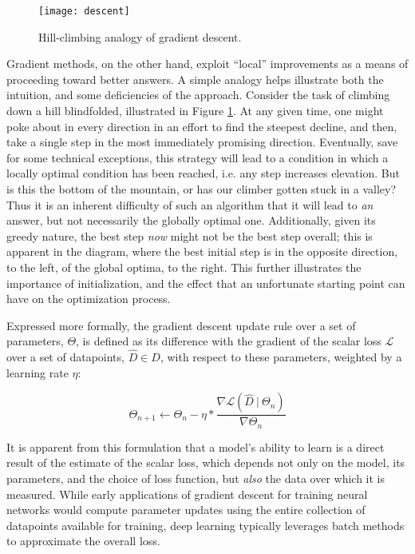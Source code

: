\begin{figure}
\begin{centering}
\texttt{[image: descent]}
\caption{Hill-climbing analogy of gradient descent.}
\label{fig:climbing}
\end{centering}
\end{figure}

Gradient methods, on the other hand, exploit ``local'' improvements as a means of proceeding toward better answers.
A simple analogy helps illustrate both the intuition, and some deficiencies of the approach.
Consider the task of climbing down a hill blindfolded, illustrated in Figure \ref{fig:climbing}.
At any given time, one might poke about in every direction in an effort to find the steepest decline, and then, take a single step in the most immediately promising direction.
Eventually, save for some technical exceptions, this strategy will lead to a condition in which a locally optimal condition has been reached, i.e. any step increases elevation.
But is this the bottom of the mountain, or has our climber gotten stuck in a valley?
Thus it is an inherent difficulty of such an algorithm that it will lead to \emph{an} answer, but not necessarily the globally optimal one.
Additionally, given its greedy nature, the best step \emph{now} might not be the best step overall;
this is apparent in the diagram, where the best initial step is in the opposite direction, to the left, of the global optima, to the right.
This further illustrates the importance of initialization, and the effect that an unfortunate starting point can have on the optimization process.

Expressed more formally, the gradient descent update rule over a set of parameters, $\Theta$, is defined as its difference with the gradient of the scalar loss $\mathcal{L}$ over a set of datapoints, $\hat{D} \in D$, with respect to these parameters, weighted by a learning rate $\eta$:

\begin{equation}
\label{eq:updaterule}
\Theta_{n+1} \leftarrow \Theta_n - \eta * \frac{ \nabla \mathcal{L}(\hat{D}~|~\Theta_n)}{\nabla \Theta_n}
\end{equation}

\noindent It is apparent from this formulation that a model's ability to learn is a direct result of the estimate of the scalar loss, which depends not only on the model, its parameters, and the choice of loss function, but \emph{also} the data over which it is measured.
While early applications of gradient descent for training neural networks would compute parameter updates using the entire collection of datapoints available for training, deep learning typically leverages batch methods to approximate the overall loss.

